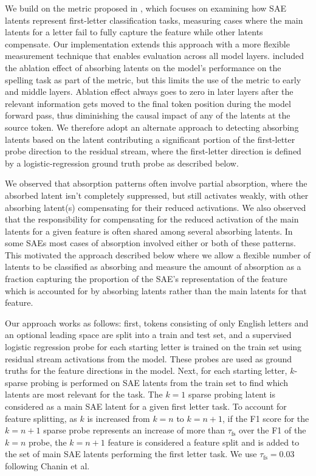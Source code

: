 \documentclass{article}
\theoremstyle{plain}
\theoremstyle{definition}
\theoremstyle{remark}
\begin{document}
We build on the metric proposed in \citet{chanin2024absorptionstudyingfeaturesplitting}, which focuses on examining how SAE latents represent first-letter classification tasks, measuring cases where the main latents for a letter fail to fully capture the feature while other latents compensate. Our implementation extends this approach with a more flexible measurement technique that enables evaluation across all model layers.  \citet{chanin2024absorptionstudyingfeaturesplitting} included the ablation effect of absorbing latents on the model’s performance on the spelling task as part of the metric, but this limits the use of the metric to early and middle layers. Ablation effect always goes to zero in later layers after the relevant information gets moved to the final token position during the model forward pass, thus diminishing the causal impact of any of the latents at the source token. We therefore adopt an alternate approach to detecting absorbing latents based on the latent contributing a significant portion of the first-letter probe direction to the residual stream, where the first-letter direction is defined by a logistic-regression ground truth probe as described below.

We observed that absorption patterns often involve partial absorption, where the absorbed latent isn’t completely suppressed, but still activates weakly, with other absorbing latent(s) compensating for their reduced activations. We also observed that the responsibility for compensating for the reduced activation of the main latents for a given feature is often shared among several absorbing latents. In some SAEs most cases of absorption involved either or both of these patterns. This motivated the approach described below where we allow a flexible number of latents to be classified as absorbing and measure the amount of absorption as a fraction capturing the proportion of the SAE's representation of the feature which is accounted for by absorbing latents rather than the main latents for that feature.

Our approach works as follows: first, tokens consisting of only English letters and an optional leading space are split into a train and test set, and a supervised logistic regression probe for each starting letter is trained on the train set using residual stream activations from the model. These probes are used as ground truths for the feature directions in the model. Next, for each starting letter, $k$-sparse probing is performed on SAE latents from the train set to find which latents are most relevant for the task. The $k=1$ sparse probing latent is considered as a main SAE latent for a given first letter task. To account for feature splitting, as $k$ is increased from $k=n$ to $k=n+1$, if the F1 score for the $k=n+1$ sparse probe represents an increase of more than $\tau_\text{fs}$ over the F1 of the $k=n$ probe, the $k=n+1$ feature is considered a feature split and is added to the set of main SAE latents performing the first letter task. We use $\tau_\text{fs} = 0.03$ following Chanin et al.
\end{document}
